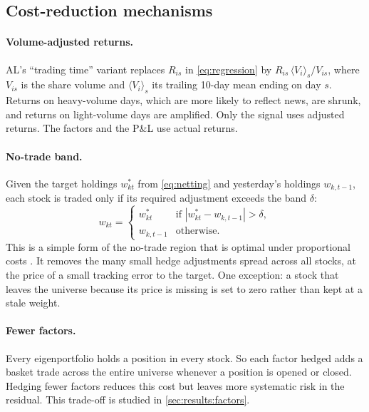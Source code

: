\subsection{Cost-reduction mechanisms}
\label{sec:method:costs}

\paragraph{Volume-adjusted returns.}
AL's ``trading time'' variant replaces $R_{is}$ in \cref{eq:regression} by
$R_{is}\,\langle V_i\rangle_s / V_{is}$, where $V_{is}$ is the share volume and
$\langle V_i\rangle_s$ its trailing 10-day mean ending on day $s$. Returns on heavy-volume days,
which are more likely to reflect news, are shrunk, and returns on light-volume days are
amplified. Only the signal uses adjusted returns. The factors and the P\&L use actual returns.

\paragraph{No-trade band.}
Given the target holdings $w^\ast_{kt}$ from \cref{eq:netting} and yesterday's holdings
$w_{k,t-1}$, each stock is traded only if its required adjustment exceeds the band $\delta$:
\begin{equation}
  w_{kt} =
  \begin{cases}
    w^\ast_{kt} & \text{if } |w^\ast_{kt} - w_{k,t-1}| > \delta, \\
    w_{k,t-1} & \text{otherwise.}
  \end{cases}
  \label{eq:band}
\end{equation}
This is a simple form of the no-trade region that is optimal under proportional costs
\citep{davis1990}. It removes the many small hedge adjustments spread across all stocks, at the
price of a small tracking error to the target. One exception: a stock that leaves the universe
because its price is missing is set to zero rather than kept at a stale weight.

\paragraph{Fewer factors.}
Every eigenportfolio holds a position in every stock. So each factor hedged adds a basket trade
across the entire universe whenever a position is opened or closed. Hedging fewer factors
reduces this cost but leaves more systematic risk in the residual. This trade-off is studied
in \cref{sec:results:factors}.

